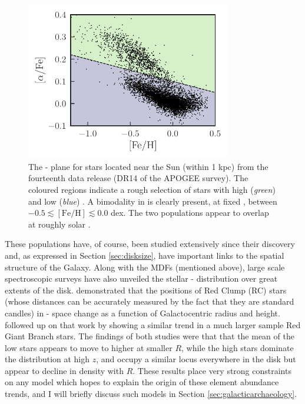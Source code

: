 \begin{figure}
    \centering
    \includegraphics[width=0.8\textwidth]{thesis/Plots/afe_split_colors.pdf}
    \caption[The \feh{} and \afe{} abundances of stars in the solar vicinity from APOGEE DR14, indicating the bimodality in \afe{} at fixed \feh{}]{The \feh{}-\afe{} plane for stars located near the Sun (within 1 kpc) from the fourteenth data release (DR14 of the APOGEE survey). The coloured regions indicate a rough selection of stars with high (\emph{green}) and low (\emph{blue}) \afe{}. A bimodality in \afe{} is clearly present, at fixed \feh{}, between $-0.5 \lesssim \mathrm{[Fe/H]} \lesssim 0.0$ dex. The two populations appear to overlap at roughly solar \feh{}.}
    \label{fig:afe_split}
\end{figure}

These populations have, of course, been studied extensively since their discovery \citep[e.g.][]{1998A&A...338..161F,2003A&A...410..527B,2005A&A...433..185B,2013A&A...560A.109H,2014A&A...562A..71B,2014A&A...564A.115A,2014ApJ...796...38N,2015ApJ...808..132H} and, as expressed in Section \ref{sec:disksize}, have important links to the spatial structure of the Galaxy. Along with the MDFs (mentioned above), large scale spectroscopic surveys have also unveiled the stellar \feh{}-\afe{} distribution over great extents of the disk.  \citet{2014ApJ...796...38N} demonstrated that the positions of Red Clump (RC) stars (whose distances can be accurately measured by the fact that they are standard candles) in \feh{}-\afe{} space change as a function of Galactocentric radius and height. \citet{2015ApJ...808..132H} followed up on that work by showing a similar trend in a much larger sample Red Giant Branch stars. The findings of both studies were that that the mean \feh{} of the low \afe{} stars appears to move to higher \feh{} at smaller $R$, while the high \afe{} stars dominate the distribution at high $z$, and occupy a similar locus everywhere in the disk but appear to decline in density with $R$. These results place very strong constraints on any model which hopes to explain the origin of these element abundance trends, and I will briefly discuss such models in Section \ref{sec:galacticarchaeology}.

